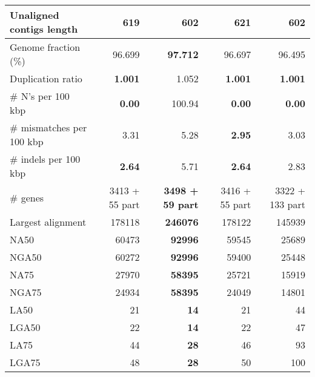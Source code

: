 \documentclass[12pt,a4paper]{article}
\begin{document}
\begin{table}[ht]
\begin{center}
\begin{tabular}{|l*{4}{|r}|}
Unaligned contigs length & 619 & {\bf 602} & 621 & {\bf 602} \\ \hline
Genome fraction (\%) & 96.699 & {\bf 97.712} & 96.697 & 96.495 \\ \hline
Duplication ratio & {\bf 1.001} & 1.052 & {\bf 1.001} & {\bf 1.001} \\ \hline
\# N's per 100 kbp & {\bf 0.00} & 100.94 & {\bf 0.00} & {\bf 0.00} \\ \hline
\# mismatches per 100 kbp & 3.31 & 5.28 & {\bf 2.95} & 3.03 \\ \hline
\# indels per 100 kbp & {\bf 2.64} & 5.71 & {\bf 2.64} & 2.83 \\ \hline
\# genes & 3413 + 55 part & {\bf 3498 + 59 part} & 3416 + 55 part & 3322 + 133 part \\ \hline
Largest alignment & 178118 & {\bf 246076} & 178122 & 145939 \\ \hline
NA50 & 60473 & {\bf 92996} & 59545 & 25689 \\ \hline
NGA50 & 60272 & {\bf 92996} & 59400 & 25448 \\ \hline
NA75 & 27970 & {\bf 58395} & 25721 & 15919 \\ \hline
NGA75 & 24934 & {\bf 58395} & 24049 & 14801 \\ \hline
LA50 & 21 & {\bf 14} & 21 & 44 \\ \hline
LGA50 & 22 & {\bf 14} & 22 & 47 \\ \hline
LA75 & 44 & {\bf 28} & 46 & 93 \\ \hline
LGA75 & 48 & {\bf 28} & 50 & 100 \\ \hline
\end{tabular}
\end{center}
\end{table}
\end{document}
